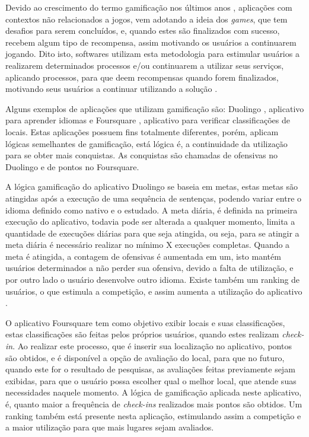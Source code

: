 \par Devido ao crescimento do termo gamificação nos últimos anos  \cite{groh2012gamification}, aplicações com contextos não relacionados a jogos, vem adotando a ideia dos \textit{games}, que tem desafios para serem concluídos, e, quando estes são finalizados com sucesso, recebem algum tipo de recompensa, assim motivando os usuários a continuarem jogando. Dito isto, softwares utilizam esta metodologia para estimular usuários a realizarem determinados processos e/ou continuarem a utilizar seus serviços, aplicando processos, para que deem recompensas quando forem finalizados, motivando seus usuários a continuar utilizando a solução \cite{hamari2014does}.
\par Alguns exemplos de aplicações que utilizam gamificação são: Duolingo  \cite{melo2016eficiencia}, aplicativo para aprender idiomas e Foursquare \cite{huotari2012defining}, aplicativo para verificar classificações de locais. Estas aplicações possuem fins totalmente diferentes, porém, aplicam lógicas semelhantes de gamificação, está lógica é, a continuidade da utilização para se obter mais conquistas. As conquistas são chamadas de ofensivas no Duolingo e de pontos no Foursquare.
\par A lógica gamificação do aplicativo Duolingo se baseia em metas, estas metas são atingidas após a execução de uma sequência de sentenças, podendo variar entre o idioma definido como nativo e o estudado. A meta diária, é definida na primeira execução do aplicativo, todavia pode ser alterada a qualquer momento, limita a quantidade de execuções diárias para que seja atingida, ou seja, para se atingir a meta diária é necessário realizar no mínimo X execuções completas. Quando a meta é atingida, a contagem de ofensivas é aumentada em um, isto mantém usuários determinados a não perder sua ofensiva, devido a falta de utilização, e por outro lado o usuário desenvolve outro idioma. Existe também um ranking de usuários, o que estimula a competição, e assim aumenta a utilização do aplicativo \cite{melo2016eficiencia}. 
\par O aplicativo Foursquare tem como objetivo exibir locais e suas classificações, estas classificações são feitas pelos próprios usuários, quando estes realizam \textit{check-in}. Ao realizar este processo, que é inserir sua localização no aplicativo, pontos são obtidos, e é disponível a opção de avaliação do local, para que no futuro, quando este for o resultado de pesquisas, as avaliações feitas previamente sejam exibidas, para que o usuário possa escolher qual o melhor local, que atende suas necessidades naquele momento. A lógica de gamificação aplicada neste aplicativo, é, quanto maior a frequência de \textit{check-ins} realizados mais pontos são obtidos. Um ranking também está presente nesta aplicação, estimulando assim a competição e a maior utilização para que mais lugares sejam avaliados\cite{huotari2012defining}.
